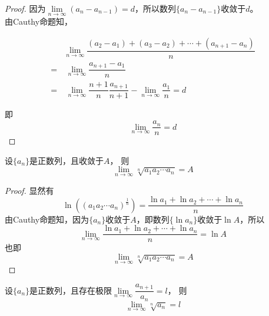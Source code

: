 \begin{proof}

    因为$\lim\limits_{n\to\infty}{(a_n - a_{n-1})} = d$，所以数列$\{a_n - a_{n - 1}\}$收敛于$d$。\\
    由\textup{Cauthy}命题知，
    
    \begin{align*}
        & \lim\limits_{n\to\infty}{\dfrac{(a_2 - a_1) + (a_3 - a_2) + \cdots + (a_{n + 1} - a_n)}{n}} \\
        = & \ \lim\limits_{n\to\infty}{\dfrac{a_{n + 1} - a_1}{n}} \\
        = & \ \lim\limits_{n\to\infty}{\dfrac{n + 1}{n} \dfrac{a_{n + 1}}{n + 1}} - \lim\limits_{n\to\infty}{\dfrac{a_1}{n}} = d
    \end{align*}

    即
    $$\lim\limits_{n\to\infty}{\dfrac{a_n}{n}} = d$$

\end{proof}

\begin{corollary}[Cauthy命题推论]

    设$\{a_n\}$是正数列，且收敛于$A$，
    则
    $$\lim\limits_{n\to\infty}{\sqrt[n]{a_1a_2\cdots a_n}} = A$$

\end{corollary}

\begin{proof}

    显然有
    $$\ln{\left((a_1a_2\cdots a_n)^{\frac{1}{n}}\right)} = \dfrac{\ln{a_1} + \ln{a_2} + \cdots + \ln{a_n}}{n}$$
    由\textup{Cauthy}命题知，因为$\{a_n\}$收敛于$A$，即数列$\{\ln{a_n}\}$收敛于$\ln{A}$，所以
    $$\lim\limits_{n\to\infty}{\dfrac{\ln{a_1} + \ln{a_2} + \cdots + \ln{a_n}}{n}} = \ln{A}$$
    也即
    $$\lim\limits_{n\to\infty}{\sqrt[n]{a_1a_2\cdots a_n}} = A$$

\end{proof}


\begin{corollary}[Cauthy命题推论]

    设$\{a_n\}$是正数列，且存在极限$\lim\limits_{n\to\infty}{\dfrac{a_{n+1}}{a_n}}=l$，
    则
    $$\lim\limits_{n\to\infty}{\sqrt[n]{a_n}} = l$$

\end{corollary}

